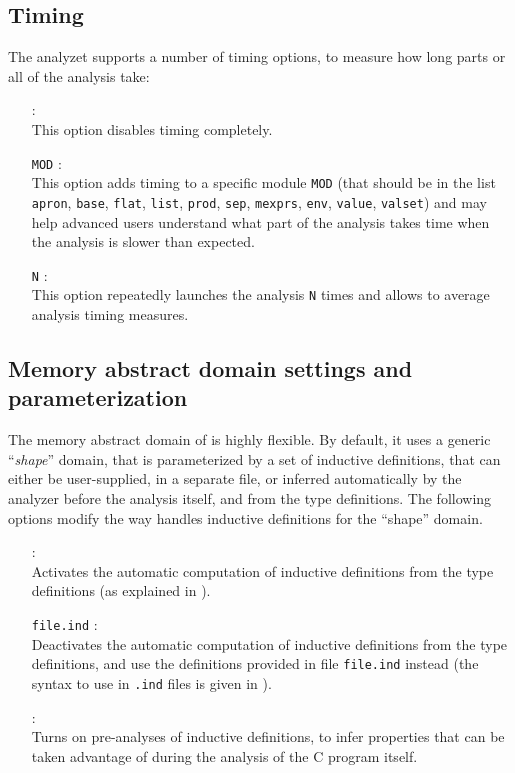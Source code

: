 \subsection{Timing}
\label{s:opt:timing}
The \memcad analyzet supports a number of timing options, to measure
how long parts or all of the analysis take:
\begin{itemize}
\item[\doption{-no-timing}]: \\
  This option disables timing completely.
\item[\doption{-timing} \texttt{MOD}] \optadv: \\
  This option adds timing to a specific module \texttt{MOD}
  (that should be in the list \texttt{apron}, \texttt{base},
  \texttt{flat}, \texttt{list}, \texttt{prod}, \texttt{sep},
  \texttt{mexprs}, \texttt{env}, \texttt{value}, \texttt{valset})
  and may help advanced users understand what part of the analysis
  takes time when the analysis is slower than expected.
\item[\doption{-stress-test} \texttt{N}]: \\
  This option repeatedly launches the analysis \texttt{N} times
  and allows to average analysis timing measures.
\item[\doption{-no-analyze-prog-timer}] \optdev
\end{itemize}

\subsection{Memory abstract domain settings and parameterization}
\label{s:opt:mem}
The memory abstract domain of \memcad is highly flexible.
By default, it uses a generic ``{\em shape}'' domain, that is
parameterized by a set of inductive definitions, that can either
be user-supplied, in a separate file, or inferred automatically
by the analyzer before the analysis itself, and from the type
definitions.
The following options modify the way \memcad handles inductive
definitions for the ``shape'' domain.
\label{opt:ind}
\begin{itemize}
\item[\doption{-auto-ind}]: \\
  Activates the automatic computation of inductive definitions
  from the type definitions (as explained in ).
\item[\doption{-use-ind} \texttt{file.ind}]: \\
  Deactivates the automatic computation of inductive definitions
  from the type definitions, and use the definitions provided in
  file \texttt{file.ind} instead (the syntax to use in \texttt{.ind}
  files is given in ).
\item[\doption{-ind-analysis}]: \\
  Turns on pre-analyses of inductive definitions, to infer properties
  that can be taken advantage of during the analysis of the C program
  itself.
\item[\doption{-no-prev-fields}] \optdev
\end{itemize}

